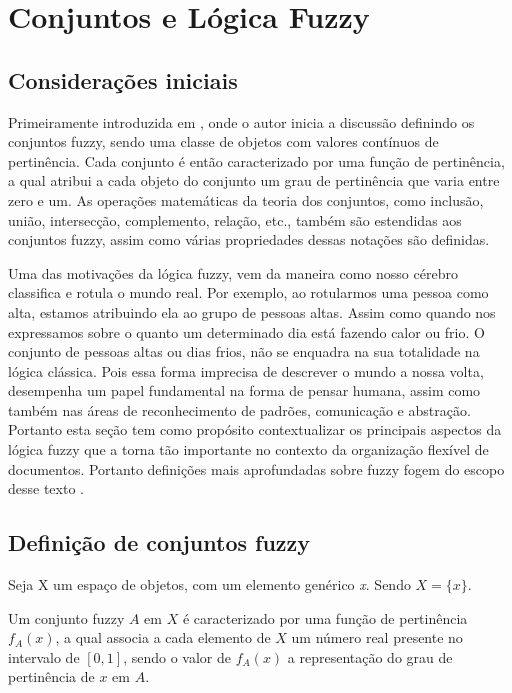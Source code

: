 \section{Conjuntos e Lógica Fuzzy}
\subsection{Considerações iniciais}
Primeiramente introduzida em \cite{Zadeh1965}, onde o autor inicia a discussão definindo os
conjuntos fuzzy, sendo uma classe de objetos com valores contínuos de pertinência. Cada conjunto é
então caracterizado por uma função de pertinência, a qual atribui a cada objeto do conjunto um grau
de pertinência que varia entre zero e um. As operações matemáticas da teoria dos conjuntos, como
inclusão, união, intersecção, complemento, relação, etc., também são estendidas aos conjuntos fuzzy,
assim como várias propriedades dessas notações são definidas.

Uma das motivações da lógica fuzzy, vem da maneira como nosso cérebro classifica e rotula o mundo
real. Por exemplo, ao rotularmos uma pessoa como alta, estamos atribuindo ela ao grupo de pessoas
altas. Assim como quando nos expressamos sobre o quanto um determinado dia está fazendo calor ou
frio. O conjunto de pessoas altas ou dias frios, não se enquadra na sua totalidade na lógica
clássica. Pois essa forma imprecisa de descrever o mundo a nossa volta, desempenha um papel
fundamental na forma de pensar humana, assim como também nas áreas de reconhecimento de padrões,
comunicação e abstração\cite{Zadeh1965}.  Portanto esta seção tem como propósito contextualizar os
principais aspectos da lógica fuzzy que a torna tão importante no contexto da organização flexível
de documentos. Portanto definições mais aprofundadas sobre fuzzy fogem do escopo desse texto .

\subsection{Definição de conjuntos fuzzy}

Seja X um espaço de objetos, com um elemento genérico {\it x\/}.  Sendo $X= \big\{x\big\}$.

Um conjunto fuzzy $A$ em $X$ é caracterizado por uma função de pertinência $f_A(x)$, a qual associa
a cada elemento de $X$ um número real presente no intervalo de $[0,1]$, sendo o valor de $f_A(x)$ a
representação do grau de pertinência de $x$ em $A$.

